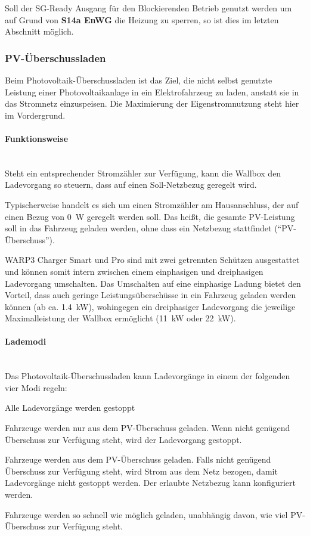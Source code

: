 \documentclass[a4paper,10pt]{article}
\begin{document}
\begin{multicols*}{2}
    Soll der SG-Ready Ausgang für den Blockierenden Betrieb genutzt werden um auf Grund von \textbf{S14a EnWG} die Heizung zu sperren, so ist dies im letzten Abschnitt möglich.

	\subsubsection{PV-Überschussladen}
	Beim Photovoltaik-Überschussladen ist das Ziel, die nicht selbst genutzte Leistung einer
	Photovoltaikanlage in ein
	Elektrofahrzeug zu laden, anstatt sie in das Stromnetz einzuspeisen. Die Maximierung der Eigenstromnutzung steht hier
	im Vordergrund.

	\paragraph{Funktionsweise}\ \\
	Steht ein entsprechender Stromzähler zur Verfügung, kann die Wallbox den
	Ladevorgang so steuern, dass auf einen Soll-Netzbezug geregelt wird.

	Typischerweise handelt es sich um einen Stromzähler am Hausanschluss, der auf
	einen Bezug von \SI{0}{\watt} geregelt werden soll. Das heißt, die gesamte
	PV-Leistung soll in das Fahrzeug geladen werden, ohne dass ein Netzbezug
	stattfindet (\enquote{PV-Überschuss}).

	WARP3 Charger Smart und Pro sind mit zwei getrennten Schützen
	ausgestattet und können somit intern zwischen einem einphasigen und dreiphasigen
	Ladevorgang umschalten. Das Umschalten auf eine einphasige Ladung bietet den Vorteil, dass auch geringe
	Leistungsüberschüsse in ein Fahrzeug geladen werden können (ab ca.
	\SI{1,4}{\kilo\watt}), wohingegen ein dreiphasiger Ladevorgang die jeweilige
	Maximalleistung der Wallbox ermöglicht (\SI{11}{\kilo\watt} oder
	\SI{22}{\kilo\watt}).

	\paragraph{Lademodi}\ \\

	Das Photovoltaik-Überschussladen kann Ladevorgänge in einem der folgenden vier Modi regeln:

	\begin{description}[labelindent=0.5cm, leftmargin=0.5cm]
	 \item[Aus] Alle Ladevorgänge werden gestoppt
	 \item[PV] Fahrzeuge werden nur aus dem PV-Überschuss geladen.
               Wenn nicht genügend Überschuss zur Verfügung steht, wird der Ladevorgang gestoppt.
	 \item[Min+PV] Fahrzeuge werden aus dem PV-Überschuss geladen.
                   Falls nicht genügend Überschuss zur Verfügung steht, wird Strom aus dem Netz bezogen,
                   damit Ladevorgänge nicht gestoppt werden.
                   Der erlaubte Netzbezug kann konfiguriert werden.
     \item[Schnell] Fahrzeuge werden so schnell wie möglich geladen, unabhängig davon, wie viel PV-Überschuss zur Verfügung steht.
	\end{description}



\end{multicols*}
\end{document}
